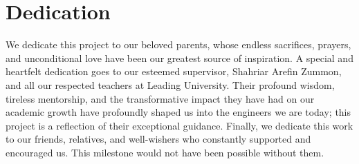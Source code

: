 \documentclass[12pt, a4paper, twoside]{report}
\begin{document}
\chapter*{Dedication}
We dedicate this project to our beloved parents, whose endless sacrifices, prayers, and unconditional love have been our greatest source of inspiration. A special and heartfelt dedication goes to our esteemed supervisor, Shahriar Arefin Zummon, and all our respected teachers at Leading University. Their profound wisdom, tireless mentorship, and the transformative impact they have had on our academic growth have profoundly shaped us into the engineers we are today; this project is a reflection of their exceptional guidance. Finally, we dedicate this work to our friends, relatives, and well-wishers who constantly supported and encouraged us. This milestone would not have been possible without them.
\end{document}
